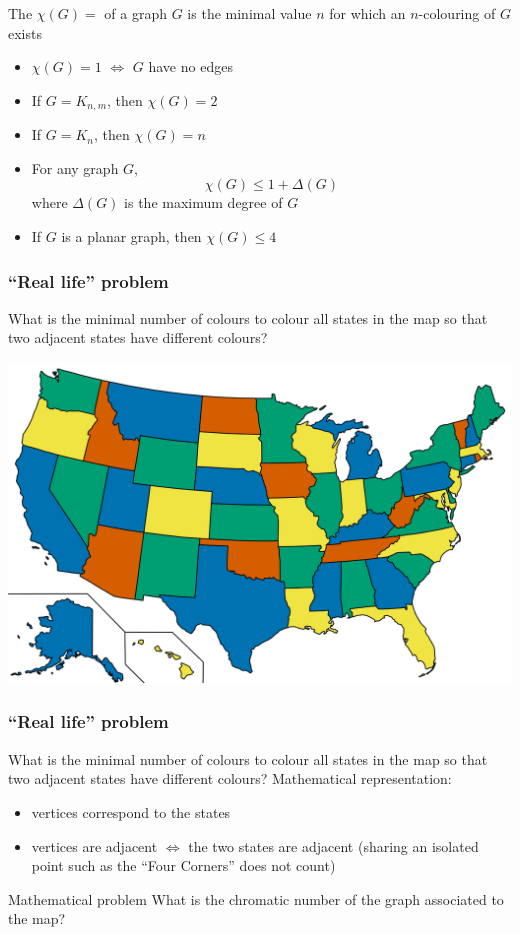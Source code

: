\documentclass[aspectratio=43]{beamer}
\begin{document}
\begin{frame}
\begin{definition}
The  $\chi (G)=$ of a graph $G$ is the minimal value $n$ for which an $n$-colouring of $G$ exists
\end{definition}
\vfill
\begin{theorem}
\begin{itemize}
\item $\chi (G)=1$ $\iff$ $G$ have no edges
\item If $G=K_{n,m}$, then $\chi(G)=2$
\item If $G=K_n$, then $\chi(G)=n$
\item For any graph $G$, $$\chi (G)\leq 1+ \Delta (G)$$
where $\Delta (G)$ is the maximum degree of $G$
\item If $G$ is a planar graph, then $\chi(G) \leq 4$
\end{itemize}
\end{theorem}
\end{frame}


\begin{frame}\frametitle{``Real life'' problem}
What is the minimal number of colours to colour all states in the map so that two adjacent states have different colours?
\begin{center}
\includegraphics[width=.85\textwidth]{FIGS_slides/USA-4-colours}
\end{center}\end{frame}

\begin{frame}\frametitle{``Real life'' problem}
	What is the minimal number of colours to colour all states in the map so that two adjacent states have different colours?
	\vfill
Mathematical representation:
\begin{itemize}
\item vertices correspond to the states
\item vertices are adjacent $\iff$ the two states are adjacent (sharing an isolated point such as the ``Four Corners'' does not count)
\end{itemize}
\vfill
\begin{block}{Mathematical problem}
What is the chromatic number of the graph associated to the map?
\end{block}
\end{frame}
\end{document}
